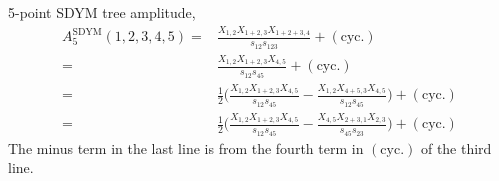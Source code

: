 \documentclass[a4paper,11pt]{article}
\begin{document}
5-point SDYM tree amplitude,
\begin{equation}
    \begin{split}
    A_5^{\text{SDYM}}(1,2,3,4,5)=&\frac{X_{1,2}X_{1+2,3}X_{1+2+3,4}}{s_{12}s_{123}}+(\text{cyc.})\\
    =&\frac{X_{1,2}X_{1+2,3}X_{4,5}}{s_{12}s_{45}}+(\text{cyc.})\\
    =&\frac{1}{2}\Bigg(\frac{X_{1,2}X_{1+2,3}X_{4,5}}{s_{12}s_{45}}-\frac{X_{1,2}X_{4+5,3}X_{4,5}}{s_{12}s_{45}}\Bigg)+(\text{cyc.})\\
    =&\frac{1}{2}\Bigg(\frac{X_{1,2}X_{1+2,3}X_{4,5}}{s_{12}s_{45}}-\frac{X_{4,5}X_{2+3,1}X_{2,3}}{s_{45}s_{23}}\Bigg)+(\text{cyc.})
    \end{split}
\end{equation}
The minus term in the last line is from the fourth term in $(\text{cyc.})$ of the third line.
\end{document}
